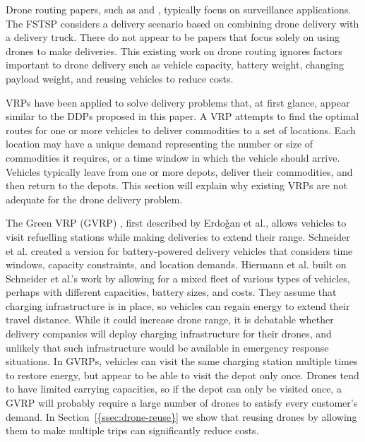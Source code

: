 \documentclass[journal]{IEEEtran}
\begin{document}
Drone routing papers, such as \cite{Sundar2014} and \cite{Guerriero2014}, typically focus on surveillance applications. The FSTSP \cite{Murray2015} considers a delivery scenario based on combining drone delivery with a delivery truck. There do not appear to be papers that focus solely on using drones to make deliveries. This existing work on drone routing ignores factors important to drone delivery such as vehicle capacity, battery weight, changing payload weight, and reusing vehicles to reduce costs.

VRPs \cite{Cordeau2007,Eksioglu2009} have been applied to solve delivery problems that, at first glance, appear similar to the DDPs proposed in this paper. A VRP attempts to find the optimal routes for one or more vehicles to deliver commodities to a set of locations. Each location may have a unique demand representing the number or size of commodities it requires, or a time window in which the vehicle should arrive. Vehicles typically leave from one or more depots, deliver their commodities, and then return to the depots. This section will explain why existing VRPs are not adequate for the drone delivery problem.

The Green VRP (GVRP) \cite{Erdogan2012}, first described by Erdo\v{g}an et al., allows vehicles to visit refuelling stations while making deliveries to extend their range. Schneider et al. \cite{Schneider2014} created a version for battery-powered delivery vehicles that considers time windows, capacity constraints, and location demands. Hiermann et al. \cite{Hiermann2016} built on Schneider et al.'s work by allowing for a mixed fleet of various types of vehicles, perhaps with different capacities, battery sizes, and costs. They assume that charging infrastructure is in place, so vehicles can regain energy to extend their travel distance. While it could increase drone range, it is debatable whether delivery companies will deploy charging infrastructure for their drones, and unlikely that such infrastructure would be available in emergency response situations. In GVRPs, vehicles can visit the same charging station multiple times to restore energy, but appear to be able to visit the depot only once. Drones tend to have limited carrying capacities, so if the depot can only be visited once, a GVRP will probably require a large number of drones to satisfy every customer's demand. In {Section~\ref{{ssec:drone-reuse}}} we show that reusing drones by allowing them to make multiple trips can significantly reduce costs.
\end{document}
